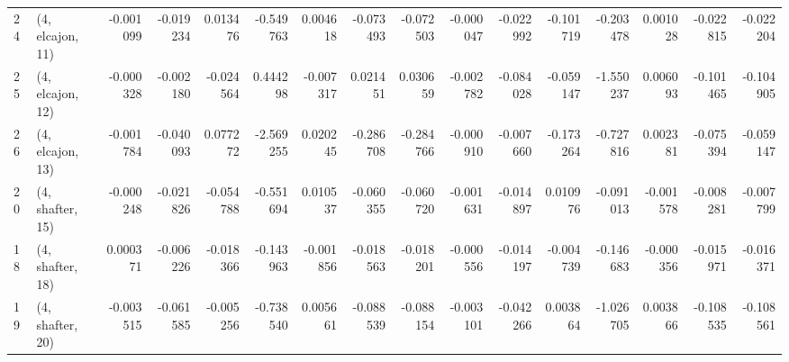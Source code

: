 \begin{tabular}{llrrrrrrrrrrrrrr}
24 &  (4, elcajon, 11) &  -0.001099 & -0.019234 &  0.013476 &  -0.549763 &  0.004618 &  -0.073493 & -0.072503 & -0.000047 & -0.022992 & -0.101719 &  -0.203478 &  0.001028 & -0.022815 & -0.022204 \\
25 &  (4, elcajon, 12) &  -0.000328 & -0.002180 & -0.024564 &   0.444298 & -0.007317 &   0.021451 &  0.030659 & -0.002782 & -0.084028 & -0.059147 &  -1.550237 &  0.006093 & -0.101465 & -0.104905 \\
26 &  (4, elcajon, 13) &  -0.001784 & -0.040093 &  0.077272 &  -2.569255 &  0.020245 &  -0.286708 & -0.284766 & -0.000910 & -0.007660 & -0.173264 &  -0.727816 &  0.002381 & -0.075394 & -0.059147 \\
20 &  (4, shafter, 15) &  -0.000248 & -0.021826 & -0.054788 &  -0.551694 &  0.010537 &  -0.060355 & -0.060720 & -0.001631 & -0.014897 &  0.010976 &  -0.091013 & -0.001578 & -0.008281 & -0.007799 \\
18 &  (4, shafter, 18) &   0.000371 & -0.006226 & -0.018366 &  -0.143963 & -0.001856 &  -0.018563 & -0.018201 & -0.000556 & -0.014197 & -0.004739 &  -0.146683 & -0.000356 & -0.015971 & -0.016371 \\
19 &  (4, shafter, 20) &  -0.003515 & -0.061585 & -0.005256 &  -0.738540 &  0.005661 &  -0.088539 & -0.088154 & -0.003101 & -0.042266 &  0.003864 &  -1.026705 &  0.003866 & -0.108535 & -0.108561 \\
\bottomrule
\end{tabular}
